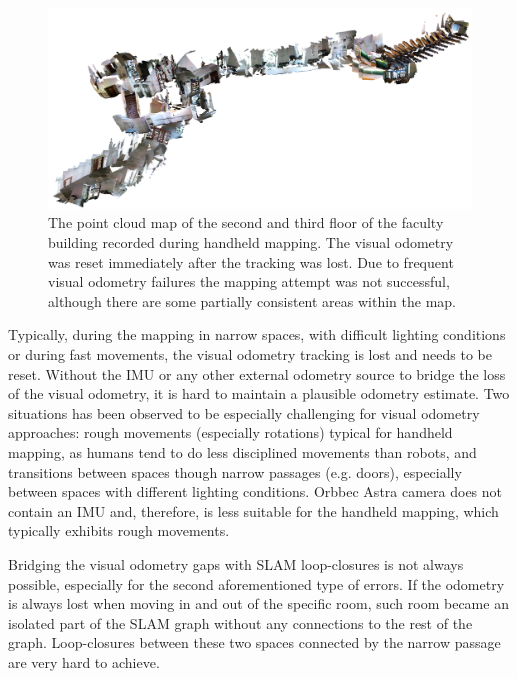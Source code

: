 \begin{figure}
    \centering
    \includegraphics[width=\textwidth]{../img/mff_second_third_floor.png}
    \caption[A broken point cloud map of multiple campus floors]{The point cloud map of the second and third floor of the faculty building recorded during handheld mapping. The visual odometry was reset immediately after the tracking was lost. Due to frequent visual odometry failures the mapping attempt was not successful, although there are some partially consistent areas within the map.}
    \label{fig:mff_second_third_floor}
\end{figure}

Typically, during the mapping in narrow spaces, with difficult lighting conditions or during fast movements, the visual odometry tracking is lost and needs to be reset. Without the \gls{IMU} or any other external odometry source to bridge the loss of the visual odometry, it is hard to maintain a plausible odometry estimate. Two situations has been observed to be especially challenging for visual odometry approaches: rough movements (especially rotations) typical for handheld mapping, as humans tend to do less disciplined movements than robots, and transitions between spaces though narrow passages (e.g. doors), especially between spaces with different lighting conditions. Orbbec Astra camera does not contain an \gls{IMU} and, therefore, is less suitable for the handheld mapping, which typically exhibits rough movements.

Bridging the visual odometry gaps with \gls{SLAM} loop-closures is not always possible, especially for the second aforementioned type of errors. If the odometry is always lost when moving in and out of the specific room, such room became an isolated part of the \gls{SLAM} graph without any connections to the rest of the graph. Loop-closures between these two spaces connected by the narrow passage are very hard to achieve.

